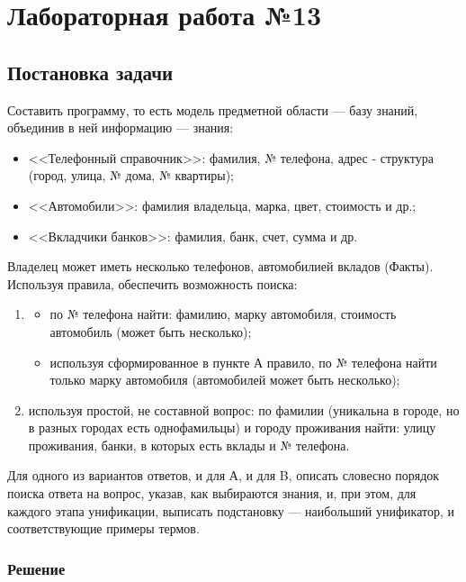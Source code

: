 \documentclass[12pt]{report}
\begin{document}
\chapter*{Лабораторная работа №13}
\section*{Постановка задачи}
Составить программу, то есть модель предметной области — базу знаний, объединив в ней информацию — знания:

\begin{itemize}
	\item <<Телефонный справочник>>: фамилия, № телефона, адрес - структура (город, улица, № дома, № квартиры);
	\item <<Автомобили>>: фамилия владельца, марка, цвет, стоимость и др.;
	\item <<Вкладчики банков>>: фамилия, банк, счет, сумма и др.
\end{itemize}

Владелец может иметь несколько телефонов, автомобилией вкладов (Факты). Используя правила, обеспечить возможность поиска:

\begin{enumerate}
	\item \begin{itemize}
		\item по № телефона найти: фамилию, марку автомобиля, стоимость автомобиль (может быть несколько);
		\item используя сформированное в пункте А правило, по № телефона найти только марку автомобиля (автомобилей может быть несколько);
	\end{itemize}
	\item используя простой, не составной вопрос: по фамилии (уникальна в городе, но в разных городах есть однофамильцы) и городу проживания найти: улицу проживания, банки, в которых есть вклады и № телефона.
\end{enumerate}

Для одного из вариантов ответов, и для А, и для B, описать словесно порядок поиска ответа на вопрос, указав, как выбираются знания, и, при этом, для каждого этапа унификации, выписать подстановку — наибольший унификатор, и соответствующие примеры термов.

\subsection*{Решение}
\end{document}
